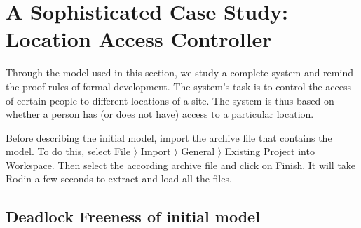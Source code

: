 \clearpage
\section{A Sophisticated Case Study: Location Access Controller}
\label{tut_location_access_controller}




Through the model used in this section, we study a complete system and remind the proof rules of formal development. The system's task is to control the access of certain people to different locations of a site. The system is thus based on whether a person has (or does not have) access to a particular location.

Before describing the initial model, import the archive file  that contains the model. To do this, select  \textsf{File $\rangle$ Import $\rangle$ General $\rangle$ Existing Project into Workspace}. Then select the according archive file and click on \textsf{Finish}. It will take Rodin a few seconds to extract and load all the files.

\subsection{Deadlock Freeness of initial model}
\label{deadlock}
\label{tut_initial_model}


 
